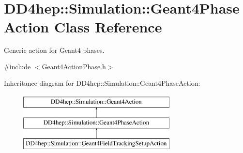 \hypertarget{class_d_d4hep_1_1_simulation_1_1_geant4_phase_action}{}\section{D\+D4hep\+:\+:Simulation\+:\+:Geant4\+Phase\+Action Class Reference}
\label{class_d_d4hep_1_1_simulation_1_1_geant4_phase_action}


Generic action for Geant4 phases.  




{\ttfamily \#include $<$Geant4\+Action\+Phase.\+h$>$}

Inheritance diagram for D\+D4hep\+:\+:Simulation\+:\+:Geant4\+Phase\+Action\+:\begin{figure}[H]
\begin{center}
\leavevmode
\includegraphics[height=3.000000cm]{class_d_d4hep_1_1_simulation_1_1_geant4_phase_action}
\end{center}
\end{figure}

